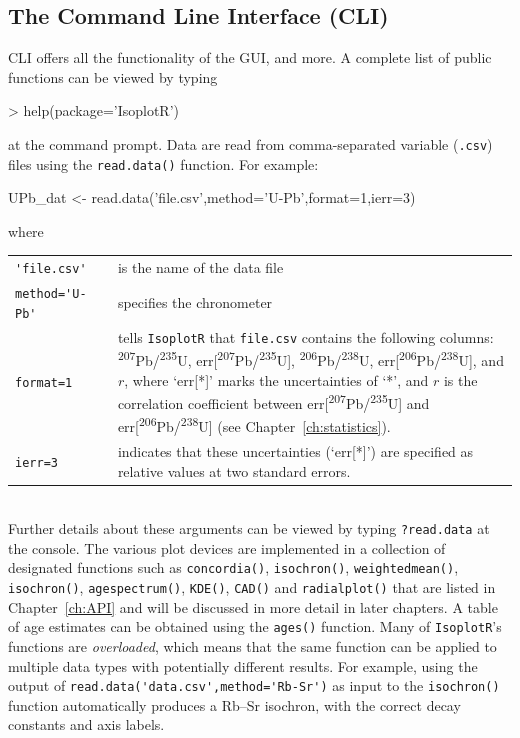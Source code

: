 \begin{refsection}
\section{The Command Line Interface (CLI)}\label{sec:CLI}

CLI offers all the functionality of the GUI, and more. A complete list
of public functions can be viewed by typing

\begin{console}
> help(package='IsoplotR')
\end{console}

\noindent at the command prompt. Data are read from comma-separated
variable (\texttt{.csv}) files using the \texttt{read.data()}
function. For example:

\begin{script}
UPb_dat <- read.data('file.csv',method='U-Pb',format=1,ierr=3)
\end{script}

\noindent where\\

\noindent\begin{tabular}{@{}p{}@{}p{}@{}p{}@{}}
\verb|'file.csv'| && is the name of the data
file\\ \verb|method='U-Pb'| && specifies the
chronometer\\ \verb|format=1| && tells \texttt{IsoplotR} that
\verb|file.csv| contains the following columns:
\textsuperscript{207}Pb/\textsuperscript{235}U,
err[\textsuperscript{207}Pb/\textsuperscript{235}U],
\textsuperscript{206}Pb/\textsuperscript{238}U,
err[\textsuperscript{206}Pb/\textsuperscript{238}U], and $r$, where
`err[*]' marks the uncertainties of `*', and $r$ is the correlation
coefficient between
err[\textsuperscript{207}Pb/\textsuperscript{235}U] and
err[\textsuperscript{206}Pb/\textsuperscript{238}U] (see
Chapter~\ref{ch:statistics}).\\ \verb|ierr=3| && indicates that these
uncertainties (`err[*]') are specified as relative values at two
standard errors.
\end{tabular}\\

\noindent Further details about these arguments can be viewed by
typing \texttt{?read.data} at the console. The various plot devices
are implemented in a collection of designated functions such as
\texttt{concordia()}, \texttt{isochron()}, \texttt{weightedmean()},
\texttt{isochron()}, \texttt{agespectrum()}, \texttt{KDE()},
\texttt{CAD()} and \texttt{radialplot()} that are listed in
Chapter~\ref{ch:API} and will be discussed in more detail in later
chapters. A table of age estimates can be obtained using the
\texttt{ages()} function. Many of \texttt{IsoplotR}'s functions are
\emph{overloaded}, which means that the same function can be applied
to multiple data types with potentially different results. For
example, using the output of
\verb|read.data('data.csv',method='Rb-Sr')| as input to the
\texttt{isochron()} function automatically produces a Rb--Sr isochron,
with the correct decay constants and axis labels.\\


\end{refsection}
